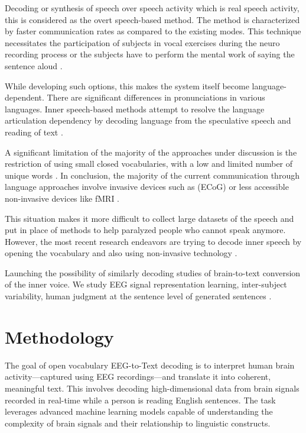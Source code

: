 \documentclass[journal]{IEEEtran}
\begin{document}
Decoding or synthesis of speech over speech activity which is real speech activity, this is considered as the overt speech-based method. The method is characterized by faster communication rates \cite{Makin2020} as compared to the existing modes. This technique necessitates the participation of subjects in vocal exercises during the neuro recording process \cite{Anumanchipalli2019} or the subjects have to perform the mental work of saying the sentence aloud \cite{Brigham2010}.

While developing such options, this makes the system itself become language-dependent. There are significant differences in pronunciations in various languages. Inner speech-based methods attempt to resolve the language articulation dependency by decoding language from the speculative speech and reading of text \cite{Defossez2023, Nieto2022}.

A significant limitation of the majority of the approaches under discussion is the restriction of using small closed vocabularies, with a low and limited number of unique words \cite{Brigham2010, Pandarinath2017}. In conclusion, the majority of the current communication through language approaches involve invasive devices such as (ECoG) \cite{Willett2021} or less accessible non-invasive devices like fMRI \cite{Nieto2022}.

This situation makes it more difficult to collect large datasets of the speech and put in place of methods to help paralyzed people who cannot speak anymore. However, the most recent research endeavors are trying to decode inner speech by opening the vocabulary and also using non-invasive technology \cite{Defossez2023, Nieto2022}.

Launching the possibility of similarly decoding studies of brain-to-text conversion of the inner voice. We study EEG signal representation learning, inter-subject variability, human judgment at the sentence level of generated sentences \cite{Wang2022}.



\section{Methodology}


The goal of open vocabulary EEG-to-Text decoding is to interpret human brain activity—captured using EEG recordings—and translate it into coherent, meaningful text. This involves decoding high-dimensional data from brain signals recorded in real-time while a person is reading English sentences. The task leverages advanced machine learning models capable of understanding the complexity of brain signals and their relationship to linguistic constructs.
\end{document}
